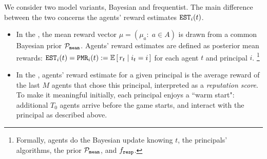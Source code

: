 


We consider two model variants, Bayesian and frequentist. The main difference between the two concerns the agents' reward estimates $\mathtt{EST}_i(t)$.

\begin{itemize}
\item In the \emph{\TheoryModel}, the mean reward vector $\mu = (\mu_a:\; a\in A)$ is drawn from a common Bayesian prior $\mathcal{P}_\mathtt{mean}$.  Agents' reward estimates are defined as posterior mean rewards:
        $\est_i(t) = \PMR_i(t) := \E\sbr{ r_t\mid i_t = i}$
    for each agent $t$ and principal $i$.%
\footnote{Formally, agents do the Bayesian update knowing $t$, the principals' algorithms, the prior $\mathcal{P}_\mathtt{mean}$, and $f_{\mathtt{resp}}$.}


\item In the \emph{\ExptsModel}, agents' reward estimate for a given principal is the average reward of the last $M$ agents that chose this principal, interpreted as a  \emph{reputation score}. To make it meaningful initially, each principal enjoys a ``warm start": additional $T_0$ agents arrive before the game starts, and interact with the principal as described above.

\end{itemize}

